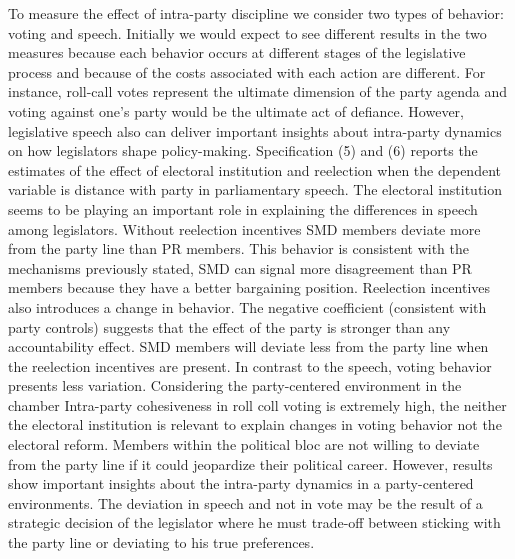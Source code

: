\documentclass{article}
\begin{document}
To measure the effect of intra-party discipline we consider two types of behavior: voting and speech. Initially we would expect to see different results in the two measures because each behavior occurs at different stages of the legislative process and because of the  costs associated with each action are different. For instance, roll-call votes represent the ultimate dimension of the party agenda and voting against one's party would be the ultimate act of defiance. However, legislative speech also can deliver important insights about intra-party dynamics on how legislators shape policy-making. Specification (5) and (6) reports the estimates of the effect of electoral institution and reelection when the dependent variable is distance with party in parliamentary speech. The electoral institution seems to be playing an important role in explaining the differences in speech among legislators. Without reelection incentives SMD members deviate more from the party line than PR members. This behavior is consistent with the mechanisms previously stated, SMD can signal more disagreement than PR members because they have a better bargaining position.  Reelection incentives also introduces a change in behavior. The negative coefficient (consistent with party controls) suggests that the effect of the party is stronger than any accountability effect. SMD members will deviate less from the party line when the reelection incentives are present. In contrast to the speech, voting behavior presents less variation. Considering the party-centered environment in the chamber Intra-party cohesiveness in roll coll voting is extremely high, the neither the electoral institution is relevant to explain changes in voting behavior not the electoral reform. Members within the political bloc are not willing to deviate from the party line if it could jeopardize their political career. However, results show important insights about the intra-party dynamics in a party-centered environments. The deviation in speech and not in vote may be the result of a strategic decision of the legislator where he must trade-off between sticking with the party line or deviating to his true preferences. \\
\\ 
\end{document}
